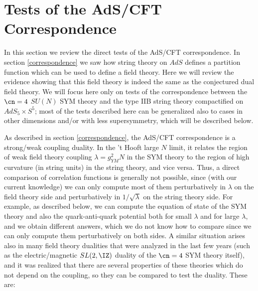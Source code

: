 \section{Tests of the AdS/CFT Correspondence} 
\label{tests}

In this section we review the direct tests of the AdS/CFT
correspondence. In section \ref{correspondence} 
we saw how string theory on $AdS$
defines a partition function which can be used to define a field
theory. Here we will review the evidence showing that this field
theory is indeed the same as the conjectured dual field theory. We
will focus here only on tests of the correspondence between the
$\cn=4$ $SU(N)$ SYM theory and the type IIB string theory compactified
on $AdS_5\times S^5$; most of the tests described here can
be generalized also to cases in other dimensions and/or with less
supersymmetry, which will be described below.

As described in section \ref{correspondence}, 
the AdS/CFT correspondence is a
strong/weak coupling duality. In the 't Hooft large $N$ limit, it
relates the region of weak field theory coupling $\lambda=g_{YM}^2 N$
in the SYM theory to the region of high curvature (in string units) in
the string theory, and vice versa. Thus, a direct comparison of
correlation functions is generally not possible, since (with our
current knowledge) we can only compute most of them perturbatively in
$\lambda$ on the field theory side and perturbatively in
$1/\sqrt{\lambda}$ on the string theory side. For example, as
described below, we can compute the equation of state of the SYM
theory and also the quark-anti-quark potential both for small
$\lambda$ and for large $\lambda$, and we obtain different answers,
which we do not know how to compare since we can only compute them
perturbatively on both sides. A similar situation arises also in many
field theory dualities that were analyzed in the last few years (such
as the electric/magnetic $SL(2,\IZ)$ duality of the $\cn=4$ SYM theory
itself), and it was realized that there are several properties of
these theories which do not depend on the coupling, so they can be
compared to test the duality. These are:

